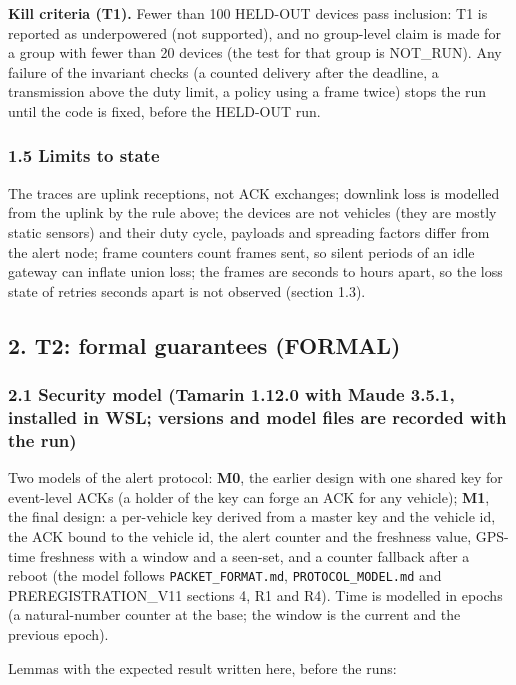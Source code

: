 \textbf{Kill criteria (T1).} Fewer than 100 HELD-OUT devices pass inclusion: T1 is reported as underpowered (not supported), and no group-level claim is made for a group with fewer than 20 devices (the test for that group is NOT\_RUN). Any failure of the invariant checks (a counted delivery after the deadline, a transmission above the duty limit, a policy using a frame twice) stops the run until the code is fixed, before the HELD-OUT run.

\subsubsection*{1.5 Limits to state}

The traces are uplink receptions, not ACK exchanges; downlink loss is modelled from the uplink by the rule above; the devices are not vehicles (they are mostly static sensors) and their duty cycle, payloads and spreading factors differ from the alert node; frame counters count frames sent, so silent periods of an idle gateway can inflate union loss; the frames are seconds to hours apart, so the loss state of retries seconds apart is not observed (section 1.3).

\subsection*{2. T2: formal guarantees (FORMAL)}

\subsubsection*{2.1 Security model (Tamarin 1.12.0 with Maude 3.5.1, installed in WSL; versions and model files are recorded with the run)}

Two models of the alert protocol: \textbf{M0}, the earlier design with one shared key for event-level ACKs (a holder of the key can forge an ACK for any vehicle); \textbf{M1}, the final design: a per-vehicle key derived from a master key and the vehicle id, the ACK bound to the vehicle id, the alert counter and the freshness value, GPS-time freshness with a window and a seen-set, and a counter fallback after a reboot (the model follows \texttt{PACKET\_FORMAT.md}, \texttt{PROTOCOL\_MODEL.md} and PREREGISTRATION\_V11 sections 4, R1 and R4). Time is modelled in epochs (a natural-number counter at the base; the window is the current and the previous epoch).

Lemmas with the expected result written here, before the runs:

